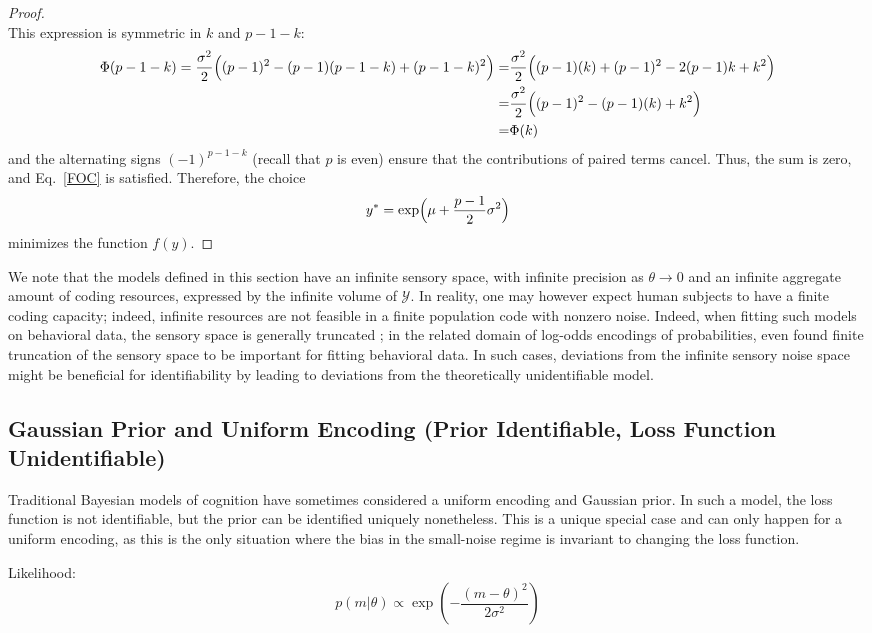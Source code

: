 \begin{proof}
\[\]
This expression is symmetric in $k$ and $p-1-k$:
\begin{align*}
  \Phi(p-1-k) =  \frac{\sigma^2}{2}\Bigl((p-1)^2 - (p-1)(p-1-k) + (p-1-k)^2\Bigr) =& \frac{\sigma^2}{2}\Bigl((p-1)(k) + (p-1)^2-2(p-1)k+k^2\Bigr) \\
    =& \frac{\sigma^2}{2}\Bigl((p-1)^2-(p-1)(k)+k^2\Bigr) \\
    =& \Phi(k)
\end{align*}
and the alternating signs $(-1)^{p-1-k}$ (recall that $p$ is even) ensure that the contributions of paired terms cancel. Thus, the sum is zero, and Eq.~\ref{FOC} is satisfied.
Therefore, the choice
\[
y^* = \exp\Bigl(\mu+\frac{p-1}{2}\sigma^2\Bigr)
\]
minimizes the function $f(y)$.
\end{proof}



We note that the models defined in this section have an infinite sensory space, with infinite precision as $\theta \rightarrow 0$ and an infinite aggregate amount of coding resources, expressed by the infinite volume of $\mathcal{Y}$.
In reality, one may however expect human subjects to have a finite coding capacity; indeed, infinite resources are not feasible in a finite population code with nonzero noise. Indeed, when fitting such models on behavioral data, the sensory space is generally truncated \citep{Petzschner2011IterativeBE}; in the related domain of log-odds encodings of probabilities, \cite{Zhang2020TheBR} even found finite truncation of the sensory space to be important for fitting behavioral data. In such cases, deviations from the infinite sensory noise space might be beneficial for identifiability by leading to deviations from the theoretically unidentifiable model.


\subsection{Gaussian Prior and Uniform Encoding (Prior Identifiable, Loss Function Unidentifiable)}
Traditional Bayesian models of cognition have sometimes considered a uniform encoding and Gaussian prior.
In such a model, the loss function is not identifiable, but the prior can be identified uniquely nonetheless.
This is a unique special case and can only happen for a uniform encoding, as this is the only situation where the bias in the small-noise regime is invariant to changing the loss function.

Likelihood:
\begin{equation}
    p(m|\theta) \propto \exp(-\frac{(m-\theta)^2}{2\sigma^2})
\end{equation}

